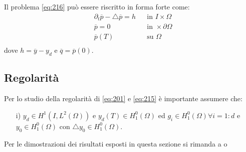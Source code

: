 Il problema \ref{eq:216} può essere riscritto in forma forte come:
\begin{equation}
\begin{aligned}
& {\partial_{t}}\overline{p} -\bigtriangleup\overline{p} = h & & \text{in }I{\times}\Omega \\
& \overline{p}=0 & & \text{in }{\times}\partial\Omega \\
& \overline{p}(T) & & \text{su }\Omega \\
\label{eq:217}
\end{aligned}
\end{equation}
dove $ h= \overline{y} - y_d$ e $\overline{q}=\overline{p}(0)$.

\subsection{Regolarità}
Per lo studio della regolarità di \ref{eq:201} e \ref{eq:215} è importante assumere che:
\begin{itemize}
\item[i)] $y_d \in H^1(I,{L^{2}(\Omega)})$ e $y_d(T) \in {H^{0}_{1}(\Omega)}$ ed $g_i \in {H^{0}_{1}(\Omega)} {\forall}i=1:d$ e $y_0 \in {H^{0}_{1}(\Omega)}$ con ${\bigtriangleup}y_0 \in {H^{0}_{1}(\Omega)}$.
\end{itemize} 
Per le dimostrazioni dei risultati esposti in questa sezione si rimanda a \cite{MAIN} o \cite{MV11}